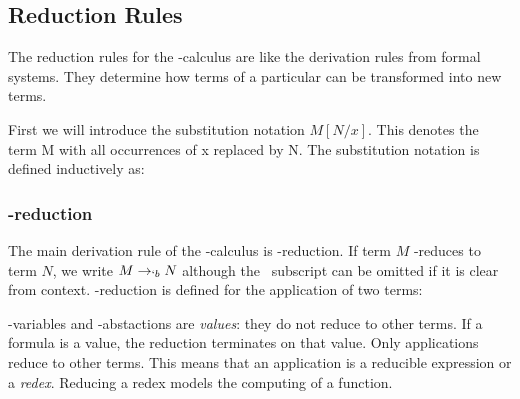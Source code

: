 \subsection{Reduction Rules}
  
  The reduction rules for the \lam-calculus are like the derivation rules from formal systems.
  They determine how terms of a particular can be transformed into new terms.
  
  First we will introduce the substitution notation $M[N/x]$. This denotes 
  the term M with all occurrences of x replaced by N. The substitution 
  notation is defined inductively as:
   
    \begin{figure}[!h]
    \end{figure}

\subsubsection{\bta-reduction}
  The main derivation rule of the \lam-calculus is \bta-reduction. If term
  $M$ \bta-reduces to term $N$, we write $M \rightarrow_{`b} N$ although 
  the \bta\ subscript can be omitted if it is clear from context. \bta-reduction
  is defined for the application of two terms:
  \begin{figure}[!h]\label{def:beta-reduction}
  \end{figure}
 
  \lam-variables and \lam-abstactions are \emph{values}: they do not reduce
  to other terms. If a formula is a value, the reduction terminates on that 
  value. Only applications reduce to other terms. This means that an 
  application is a reducible expression or a \emph{redex}. Reducing a 
  redex models the computing of a function. 

